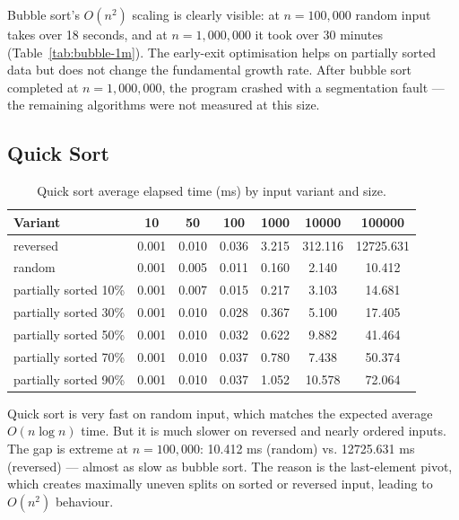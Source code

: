 \documentclass[11pt,a4paper]{article}
\begin{document}
Bubble sort's \(O(n^2)\) scaling is clearly visible: at \(n=100{,}000\) random input takes over 18 seconds, and at \(n=1{,}000{,}000\) it took over 30 minutes (Table~\ref{tab:bubble-1m}). The early-exit optimisation helps on partially sorted data but does not change the fundamental growth rate. After bubble sort completed at \(n=1{,}000{,}000\), the program crashed with a segmentation fault — the remaining algorithms were not measured at this size.

\subsection{Quick Sort}
\begin{table}[H]
\centering
\footnotesize
\begin{tabular}{lcccccc}
\toprule
Variant & 10 & 50 & 100 & 1000 & 10000 & 100000 \\
\midrule
reversed & 0.001 & 0.010 & 0.036 & 3.215 & 312.116 & 12725.631 \\
random & 0.001 & 0.005 & 0.011 & 0.160 & 2.140 & 10.412 \\
partially sorted 10\% & 0.001 & 0.007 & 0.015 & 0.217 & 3.103 & 14.681 \\
partially sorted 30\% & 0.001 & 0.010 & 0.028 & 0.367 & 5.100 & 17.405 \\
partially sorted 50\% & 0.001 & 0.010 & 0.032 & 0.622 & 9.882 & 41.464 \\
partially sorted 70\% & 0.001 & 0.010 & 0.037 & 0.780 & 7.438 & 50.374 \\
partially sorted 90\% & 0.001 & 0.010 & 0.037 & 1.052 & 10.578 & 72.064 \\
\bottomrule
\end{tabular}
\caption{Quick sort average elapsed time (ms) by input variant and size.}
\label{tab:quick-results}
\end{table}

Quick sort is very fast on random input, which matches the expected average \(O(n\log n)\) time. But it is much slower on reversed and nearly ordered inputs. The gap is extreme at \(n=100{,}000\): 10.412 ms (random) vs. 12725.631 ms (reversed) — almost as slow as bubble sort. The reason is the last-element pivot, which creates maximally uneven splits on sorted or reversed input, leading to \(O(n^2)\) behaviour.
\end{document}
